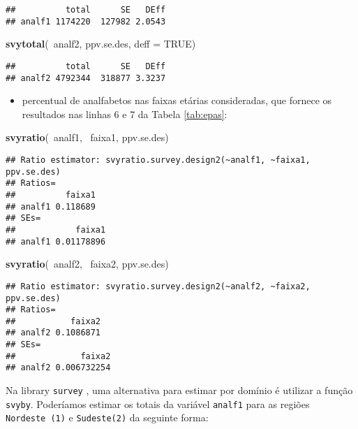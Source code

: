 \documentclass[]{book}
\newenvironment{Shaded}{\begin{snugshade}}{\end{snugshade}}
\newcommand{\KeywordTok}[1]{\textcolor[rgb]{0.13,0.29,0.53}{\textbf{{#1}}}}
\newcommand{\DataTypeTok}[1]{\textcolor[rgb]{0.13,0.29,0.53}{{#1}}}
\newcommand{\OtherTok}[1]{\textcolor[rgb]{0.56,0.35,0.01}{{#1}}}
\newcommand{\NormalTok}[1]{{#1}}
\providecommand{\tightlist}{%
  \setlength{\itemsep}{0pt}\setlength{\parskip}{0pt}}
\theoremstyle{definition}
\theoremstyle{definition}
\theoremstyle{remark}
\begin{document}
\begin{verbatim}
##          total      SE   DEff
## analf1 1174220  127982 2.0543
\end{verbatim}

\begin{Shaded}
\begin{Highlighting}[]
\KeywordTok{svytotal}\NormalTok{(~analf2, ppv.se.des, }\DataTypeTok{deff =} \OtherTok{TRUE}\NormalTok{)}
\end{Highlighting}
\end{Shaded}

\begin{verbatim}
##          total      SE   DEff
## analf2 4792344  318877 3.3237
\end{verbatim}

\begin{itemize}
\tightlist
\item
  percentual de analfabetos nas faixas etárias consideradas, que fornece
  os resultados nas linhas 6 e 7 da Tabela \ref{tab:epas}:
\end{itemize}

\begin{Shaded}
\begin{Highlighting}[]
\KeywordTok{svyratio}\NormalTok{(~analf1, ~faixa1, ppv.se.des)}
\end{Highlighting}
\end{Shaded}

\begin{verbatim}
## Ratio estimator: svyratio.survey.design2(~analf1, ~faixa1, ppv.se.des)
## Ratios=
##          faixa1
## analf1 0.118689
## SEs=
##            faixa1
## analf1 0.01178896
\end{verbatim}

\begin{Shaded}
\begin{Highlighting}[]
\KeywordTok{svyratio}\NormalTok{(~analf2, ~faixa2, ppv.se.des)}
\end{Highlighting}
\end{Shaded}

\begin{verbatim}
## Ratio estimator: svyratio.survey.design2(~analf2, ~faixa2, ppv.se.des)
## Ratios=
##           faixa2
## analf2 0.1086871
## SEs=
##             faixa2
## analf2 0.006732254
\end{verbatim}

Na library \texttt{survey} \citep{R-survey}, uma alternativa para
estimar por domínio é utilizar a função \texttt{svyby}. Poderíamos
estimar os totais da variável \texttt{analf1} para as regiões
\texttt{Nordeste\ (1)} e \texttt{Sudeste(2)} da seguinte forma:
\end{document}
